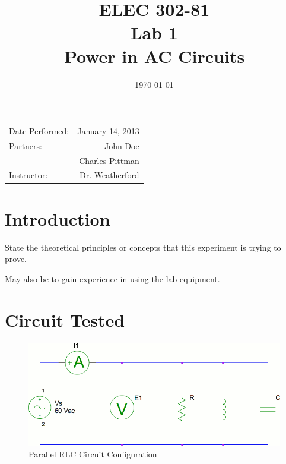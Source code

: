 \documentclass{article}
\title{ELEC 302-81\\ Lab 1\\ Power in AC Circuits} %
\date{\today} %
\begin{document}
\maketitle

\begin{center}
  \begin{tabular}{l r}
    Date Performed: & January 14, 2013 \\
    Partners: & John Doe \\
              & Charles Pittman \\
    Instructor: & Dr. Weatherford
  \end{tabular}
\end{center}

\pagebreak


\section{Introduction}
\begin{list}{}{}
  \item State the theoretical principles or concepts that this experiment is
    trying to prove.
  \item May also be to gain experience in using the lab equipment.
\end{list}

\section{Circuit Tested}
\begin{figure}[h]
  \begin{center}
    \includegraphics[width=.8\textwidth]{test_circuit}
  \caption{Parallel RLC Circuit Configuration}
  \label{test_circuit}
  \end{center}
\end{figure}
\end{document}
